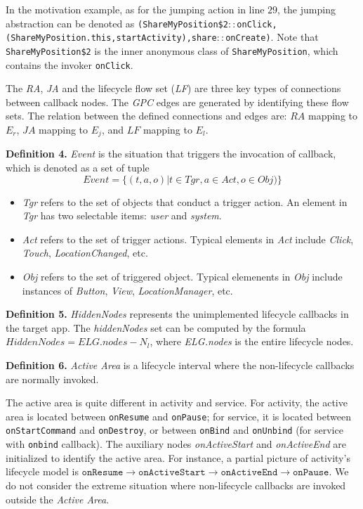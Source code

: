 In the motivation example, as for the jumping action in line $29$, the jumping abstraction can be denoted as \texttt{(ShareMyPosition\$2}$::$\texttt{onClick,(ShareMyPosition.\linebreak this,startActivity),share}$::$\texttt{onCreate)}. Note that \texttt{ShareMyPosition\$2} is the inner anonymous class of \texttt{ShareMyPosition}, which contains the invoker \texttt{onClick}.


The \textit{RA}, \textit{JA} and the lifecycle flow set (\textit{LF}) are three key types of connections between callback nodes. The \textit{GPC} edges are generated by identifying these flow sets. The relation between the defined connections and edges are:
 $RA$ mapping to  $E_{r}$,
 $JA$ mapping to  $E_{j}$, and
 $LF$ mapping to  $E_{l}$.

\textbf{Definition 4.} \textit{Event} is the situation that triggers the invocation of callback, which is denoted as a set of tuple
\begin{equation}
Event = \{( t, a, o )| t\in Tgr, a\in Act, o\in Obj)\}
\end{equation}
\begin{itemize}
\item \textit{Tgr} refers to the set of objects that conduct a trigger action. An element in \textit{Tgr} has two selectable items: \textit{user} and \textit{system}.
\item \textit{Act} refers to the set of trigger actions. Typical elements in \textit{Act} include \textit{Click}, \textit{Touch}, \textit{LocationChanged}, etc.
\item \textit{Obj} refers to the set of triggered object. Typical elemenents in \textit{Obj} include instances of \textit{Button}, \textit{View}, \textit{LocationManager}, etc.
\end{itemize}

\textbf{Definition 5.} \textit{HiddenNodes} represents the unimplemented lifecycle callbacks in the target app. The \textit{hiddenNodes} set can be computed by the formula
 $HiddenNodes = ELG.nodes - N_{l} $, where \textit{ELG.nodes} is the entire lifecycle nodes.

\textbf{Definition 6.} \textit{Active Area} is a lifecycle interval where the non-lifecycle callbacks are normally invoked.

The active area is quite different in activity and service. For activity, the active area is located between \texttt{onResume} and \texttt{onPause}; for service, it is located between \texttt{onStartCommand} and \texttt{onDestroy}, or between \texttt{onBind} and \texttt{onUnbind} (for service with \texttt{onbind} callback). The auxiliary nodes \textit{onActiveStart} and \textit{onActiveEnd} are initialized to identify the active area. For instance, a partial picture of activity's lifecycle model is  $\texttt{onResume}\rightarrow \texttt{onActiveStart}\rightarrow \texttt{onActiveEnd}\rightarrow \texttt{onPause}$.
We do not consider the extreme situation where non-lifecycle callbacks are invoked outside the \textit{Active Area}.
